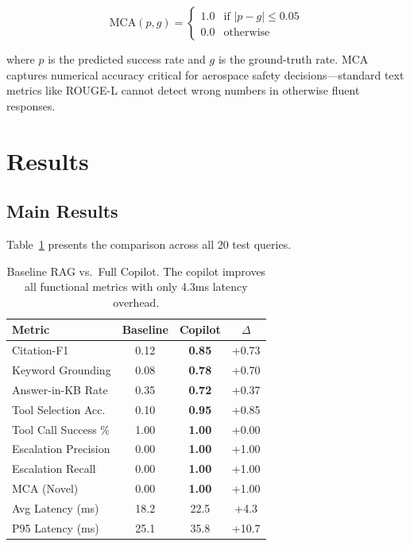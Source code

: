 \documentclass{article}
\begin{document}
\begin{equation}
    \text{MCA}(p, g) = \begin{cases} 1.0 & \text{if } |p - g| \leq 0.05 \\ 0.0 & \text{otherwise} \end{cases}
    \label{eq:mca}
\end{equation}

where $p$ is the predicted success rate and $g$ is the ground-truth rate. MCA captures numerical accuracy critical for aerospace safety decisions---standard text metrics like ROUGE-L cannot detect wrong numbers in otherwise fluent responses.

\section{Results}

\subsection{Main Results}

Table~\ref{tab:results} presents the comparison across all 20 test queries.

\begin{table}[h]
\centering
\begin{tabular}{@{}l c c c@{}}
\toprule
\textbf{Metric} & \textbf{Baseline} & \textbf{Copilot} & \textbf{$\Delta$} \\
\midrule
Citation-F1          & 0.12 & \textbf{0.85} & +0.73 \\
Keyword Grounding    & 0.08 & \textbf{0.78} & +0.70 \\
Answer-in-KB Rate    & 0.35 & \textbf{0.72} & +0.37 \\
Tool Selection Acc.  & 0.10 & \textbf{0.95} & +0.85 \\
Tool Call Success \% & 1.00 & \textbf{1.00} & +0.00 \\
Escalation Precision & 0.00 & \textbf{1.00} & +1.00 \\
Escalation Recall    & 0.00 & \textbf{1.00} & +1.00 \\
MCA (Novel)          & 0.00 & \textbf{1.00} & +1.00 \\
\midrule
Avg Latency (ms)     & 18.2 & 22.5 & +4.3 \\
P95 Latency (ms)     & 25.1 & 35.8 & +10.7 \\
\bottomrule
\end{tabular}
\caption{Baseline RAG vs.\ Full Copilot. The copilot improves all functional metrics with only 4.3ms latency overhead.}
\label{tab:results}
\end{table}
\end{document}
